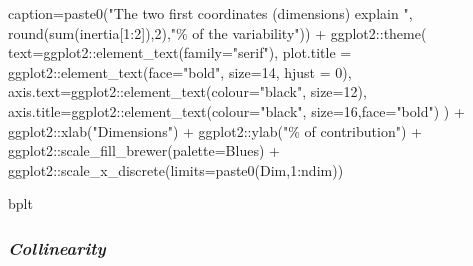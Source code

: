 \documentclass[
]{article}
\newenvironment{Shaded}{\begin{snugshade}}{\end{snugshade}}
\newcommand{\AttributeTok}[1]{\textcolor[rgb]{0.77,0.63,0.00}{#1}}
\newcommand{\DecValTok}[1]{\textcolor[rgb]{0.00,0.00,0.81}{#1}}
\newcommand{\FunctionTok}[1]{\textcolor[rgb]{0.00,0.00,0.00}{#1}}
\newcommand{\NormalTok}[1]{#1}
\newcommand{\SpecialCharTok}[1]{\textcolor[rgb]{0.00,0.00,0.00}{#1}}
\newcommand{\StringTok}[1]{\textcolor[rgb]{0.31,0.60,0.02}{#1}}
\begin{document}
\begin{Shaded}
\begin{Highlighting}[]
                \AttributeTok{caption=}\FunctionTok{paste0}\NormalTok{(}\StringTok{"The two first coordinates (dimensions) explain "}\NormalTok{,}
                               \FunctionTok{round}\NormalTok{(}\FunctionTok{sum}\NormalTok{(inertia[}\DecValTok{1}\SpecialCharTok{:}\DecValTok{2}\NormalTok{]),}\DecValTok{2}\NormalTok{),}\StringTok{"\% of the variability"}\NormalTok{)) }\SpecialCharTok{+}
\NormalTok{  ggplot2}\SpecialCharTok{::}\FunctionTok{theme}\NormalTok{(}
    \AttributeTok{text=}\NormalTok{ggplot2}\SpecialCharTok{::}\FunctionTok{element\_text}\NormalTok{(}\AttributeTok{family=}\StringTok{"serif"}\NormalTok{),}
    \AttributeTok{plot.title =}\NormalTok{ ggplot2}\SpecialCharTok{::}\FunctionTok{element\_text}\NormalTok{(}\AttributeTok{face=}\StringTok{"bold"}\NormalTok{, }\AttributeTok{size=}\DecValTok{14}\NormalTok{, }\AttributeTok{hjust =} \DecValTok{0}\NormalTok{),}
    \AttributeTok{axis.text=}\NormalTok{ggplot2}\SpecialCharTok{::}\FunctionTok{element\_text}\NormalTok{(}\AttributeTok{colour=}\StringTok{"black"}\NormalTok{, }\AttributeTok{size=}\DecValTok{12}\NormalTok{),}
    \AttributeTok{axis.title=}\NormalTok{ggplot2}\SpecialCharTok{::}\FunctionTok{element\_text}\NormalTok{(}\AttributeTok{colour=}\StringTok{"black"}\NormalTok{, }\AttributeTok{size=}\DecValTok{16}\NormalTok{,}\AttributeTok{face=}\StringTok{"bold"}\NormalTok{)}
\NormalTok{  ) }\SpecialCharTok{+}
\NormalTok{  ggplot2}\SpecialCharTok{::}\FunctionTok{xlab}\NormalTok{(}\StringTok{"Dimensions"}\NormalTok{) }\SpecialCharTok{+}\NormalTok{ ggplot2}\SpecialCharTok{::}\FunctionTok{ylab}\NormalTok{(}\StringTok{"\% of contribution"}\NormalTok{) }\SpecialCharTok{+}
\NormalTok{  ggplot2}\SpecialCharTok{::}\FunctionTok{scale\_fill\_brewer}\NormalTok{(}\AttributeTok{palette=}\StringTok{\textquotesingle{}Blues\textquotesingle{}}\NormalTok{) }\SpecialCharTok{+} 
\NormalTok{  ggplot2}\SpecialCharTok{::}\FunctionTok{scale\_x\_discrete}\NormalTok{(}\AttributeTok{limits=}\FunctionTok{paste0}\NormalTok{(}\StringTok{\textquotesingle{}Dim\textquotesingle{}}\NormalTok{,}\DecValTok{1}\SpecialCharTok{:}\NormalTok{ndim))}

\NormalTok{bplt}
\end{Highlighting}
\end{Shaded}

\hypertarget{collinearity}{%
\subsubsection{\texorpdfstring{\emph{Collinearity}}{Collinearity}}\label{collinearity}}
\end{document}
